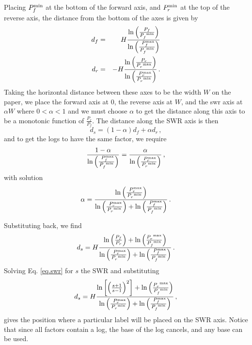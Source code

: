 \documentclass[12pt]{article}
\begin{document}
Placing $P_f^{\rm min}$ at the bottom of the forward axis, and
$P_r^{\rm min}$ at the top of the reverse axis, the distance from the
bottom of the axes is given by
\begin{eqnarray}
d_f &=& H \frac{\ln\left (\frac{P_f}{P_f^{~\rm min}}\right)}
{\ln\left (\frac{~P_f^{\rm max}}{P_f^{~\rm min}}\right)}
\nonumber\\
d_r &=& -H \frac{\ln\left (\frac{P_r}{P_r^{~\rm max}}\right)}
{\ln\left (\frac{~P_r^{\rm max}}{P_r^{~\rm min}}\right)} \,.
\end{eqnarray}
Taking the horizontal distance between these axes to be the width $W$
on the paper, we place the forward axis at $0$, the reverse axis at
$W$, and the swr axis at $\alpha W$ where $0 < \alpha < 1$ and we
must
choose $\alpha$ to get the distance along this axis to be a monotonic
function of $\frac{P_r}{P_f}$. The distance along the SWR axis is then
\begin{equation}
d_s = (1-\alpha) d_f + \alpha d_r\,,
\end{equation}
and to get the logs to have the same factor, we require
\begin{equation}
\frac{1-\alpha}
{\ln\left (\frac{~P_f^{\rm max}}{P_f^{~\rm min}}\right)}
=
\frac{\alpha}
{\ln\left (\frac{~P_r^{\rm max}}{P_r^{~\rm min}}\right)} \,,
\end{equation}
with solution
\begin{equation}
\alpha =
\frac{\ln\left (\frac{~P_r^{\rm max}}{P_r^{~\rm min}}\right)}
{\ln\left (\frac{~P_r^{\rm max}}{P_r^{~\rm min}}\right)
+
\ln\left (\frac{~P_f^{\rm max}}{P_f^{~\rm min}}\right)} \,.
\end{equation}

Substituting back, we find
\begin{equation}
d_s = H\frac{
\ln \left( \frac{P_f}{P_r} \right)
+ \ln\left ( \frac{P_r^{~\rm max}}{P_f^{~\rm min}} \right)
}
{\ln\left (\frac{~P_r^{\rm max}}{P_r^{~\rm min}}\right)
+
\ln\left (\frac{~P_f^{\rm max}}{P_f^{~\rm min}}\right)} \,.
\end{equation}
Solving Eq. \ref{eq.swr} for $s$ the SWR and substituting
\begin{equation}
d_s = H\frac{
\ln \left [\left( \frac{s+1}{s-1} \right)^2 \right ]
+ \ln\left ( \frac{P_r^{~\rm max}}{P_f^{~\rm min}} \right)
}
{\ln\left (\frac{~P_r^{\rm max}}{P_r^{~\rm min}}\right)
+
\ln\left (\frac{~P_f^{\rm max}}{P_f^{~\rm min}}\right)} \,,
\end{equation}
gives the position where a particular label will be placed on the
SWR axis.
Notice that since all factors contain a log, the base of the log
cancels, and any base can be used.
\end{document}
